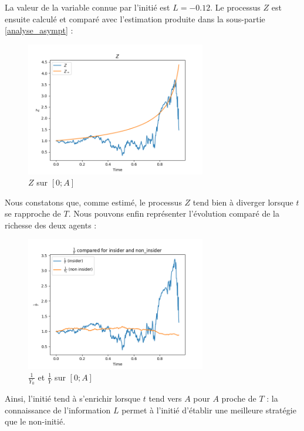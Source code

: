 \documentclass[../finalreport.tex]{subfiles}
\begin{document}
\par La valeur de la variable connue par l'initié est $L = -0.12$. Le processus $Z$ est ensuite calculé et comparé avec l'estimation produite dans la sous-partie \ref{analyse_asympt} :

\begin{figure}[H]
  \centering
    \includegraphics[width=0.7\textwidth]{images/simulation_1/compared_Z.png}
  \caption{$Z$ sur $\left[0; A \right]$}
\end{figure}

\par Nous constatons que, comme estimé, le processus $Z$ tend bien à diverger lorsque $t$ se rapproche de $T$. Nous pouvons enfin représenter l'évolution comparé de la richesse des deux agents :

\begin{figure}[H]
  \centering
    \includegraphics[width=0.7\textwidth]{images/simulation_1/compared_wealths.png}
  \caption{$\frac{1}{Y_0}$ et $\frac{1}{Y}$ sur $\left[0; A \right]$}
\end{figure}

\par Ainsi, l'initié tend à s'enrichir lorsque $t$ tend vers $A$ pour $A$ proche de $T$ : la connaissance de l'information $L$ permet à l'initié d'établir une meilleure stratégie que le non-initié.
\end{document}
